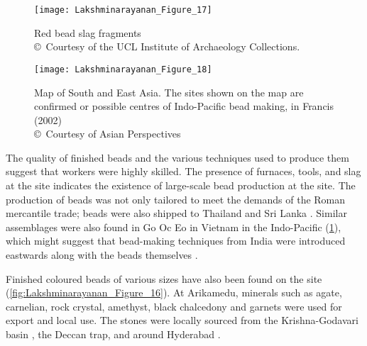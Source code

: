 \begin{figure}[!tb]
\begin{minipage}[t]{.49\linewidth}
	\texttt{[image: Lakshminarayanan\_Figure\_17]}
	\caption{Red bead slag fragments\\
		{\normalfont\scriptsize\copyright\ Courtesy of the UCL Institute of Archaeology Collections.
	}}
	\label{fig:Lakshminarayanan_Figure_17}
\end{minipage}\hfill
\begin{minipage}[t]{.49\linewidth}
	\texttt{[image: Lakshminarayanan\_Figure\_18]}
	\caption{Map of South and East Asia. The sites shown on the map are confirmed or possible centres of Indo-Pacific bead making, in Francis (2002)\\
		{\normalfont\scriptsize\copyright\ Courtesy of Asian Perspectives
	}}
	\label{fig:Lakshminarayanan_Figure_18}
\end{minipage}
\end{figure}

The quality of finished beads and the various techniques used to produce them suggest that workers were highly skilled. The presence of furnaces, tools, and slag at the site indicates the existence of large-scale bead production at the site. The production of beads was not only tailored to meet the demands of the Roman mercantile trade; beads were also shipped to Thailand and Sri Lanka \parencite[][4-5]{francis1990}. Similar assemblages were also found in Go Oc Eo in Vietnam in the Indo-Pacific (\cref{fig:Lakshminarayanan_Figure_18}), which might suggest that bead-making techniques from India were introduced eastwards along with the beads themselves \parencite[][17]{francis1990}.



Finished coloured beads of various sizes have also been found on the site (\cref{fig:Lakshminarayanan_Figure_16}). At Arikamedu, minerals such as agate, carnelian, rock crystal, amethyst, black chalcedony and garnets were used for export and local use. The stones were locally sourced from the Krishna-Godavari basin \parencite[][37]{newbold1844}, the Deccan trap, and around Hyderabad \parencite[][535]{sinkankas1996}.

